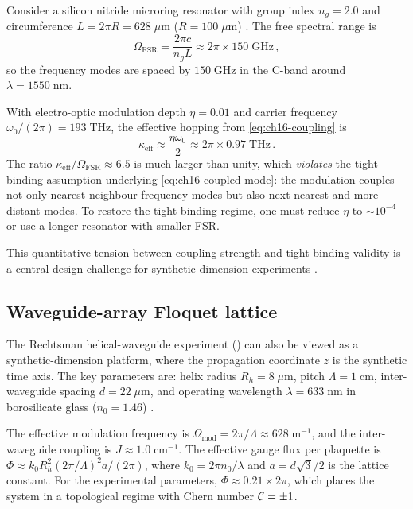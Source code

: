 Consider a silicon nitride microring resonator with group index
$n_g=2.0$ and circumference $L=2\pi R=628\;\mu\mathrm{m}$
($R=100\;\mu\mathrm{m}$)
\cite{initio2026pdf}.  The free spectral range is
\begin{equation}\label{eq:ch16-fsr-numerical}
  \Omega_{\mathrm{FSR}} = \frac{2\pi c}{n_g L}
  \approx 2\pi\times 150\;\mathrm{GHz}\,,
\end{equation}
so the frequency modes are spaced by $150\;\mathrm{GHz}$ in the
C-band around $\lambda=1550\;\mathrm{nm}$.

With electro-optic modulation depth $\eta=0.01$ and carrier frequency
$\omega_0/(2\pi)=193\;\mathrm{THz}$, the effective hopping from
\eqref{eq:ch16-coupling} is
\begin{equation}\label{eq:ch16-kappa-numerical}
  \kappa_{\mathrm{eff}} \approx \frac{\eta\omega_0}{2}
  \approx 2\pi\times 0.97\;\mathrm{THz}\,.
\end{equation}
The ratio $\kappa_{\mathrm{eff}}/\Omega_{\mathrm{FSR}}\approx 6.5$
is much larger than unity, which \emph{violates} the tight-binding
assumption underlying \eqref{eq:ch16-coupled-mode}: the modulation
couples not only nearest-neighbour frequency modes but also
next-nearest and more distant modes.  To restore the tight-binding
regime, one must reduce $\eta$ to $\sim 10^{-4}$ or use a longer
resonator with smaller FSR.

This quantitative tension between coupling strength and tight-binding
validity is a central design challenge for synthetic-dimension
experiments \cite{ozawa2018topological,price2022roadmap}.

\subsection{Waveguide-array Floquet lattice}
\label{sec:ch16-waveguide-numbers}

The Rechtsman helical-waveguide experiment ()
can also be viewed as a synthetic-dimension platform, where the
propagation coordinate $z$ is the synthetic time axis.  The key
parameters are: helix radius $R_h=8\;\mu\mathrm{m}$, pitch
$\Lambda=1\;\mathrm{cm}$, inter-waveguide spacing
$d=22\;\mu\mathrm{m}$, and operating wavelength
$\lambda=633\;\mathrm{nm}$ in borosilicate glass ($n_0=1.46$)
\cite{rechtsman2013photonica}.

The effective modulation frequency is
$\Omega_{\mathrm{mod}}=2\pi/\Lambda\approx 628\;\mathrm{m}^{-1}$,
and the inter-waveguide coupling is
$J\approx 1.0\;\mathrm{cm}^{-1}$.  The effective gauge flux per
plaquette is $\Phi\approx k_0 R_h^2(2\pi/\Lambda)^2 a/(2\pi)$,
where $k_0=2\pi n_0/\lambda$ and $a=d\sqrt{3}/2$ is the lattice
constant.  For the experimental parameters,
$\Phi\approx 0.21\times 2\pi$, which places the system in a
topological regime with Chern number $\mathcal{C}=\pm 1$.

